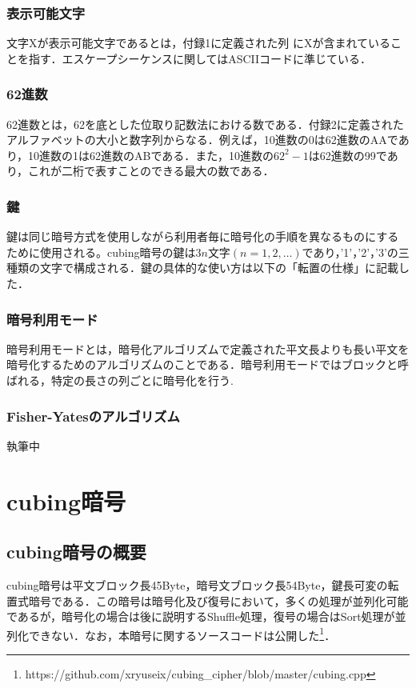 \documentclass[a4j,titlepage]{jsarticle}
\newcommand{\code}[1]{ \texttt{\detokenize{#1}} }
\begin{document}
\subsubsection{表示可能文字}
文字Xが表示可能文字であるとは，付録1に定義された列\code{printable_table}にXが含まれていることを指す．エスケープシーケンスに関してはASCIIコードに準じている．

\subsubsection{62進数}
62進数とは，62を底とした位取り記数法における数である．付録2に定義されたアルファベットの大小と数字列からなる．例えば，10進数の0は62進数のAAであり，10進数の1は62進数のABである．また，10進数の\(62^2-1\)は62進数の99であり，これが二桁で表すことのできる最大の数である．

\subsubsection{鍵}
鍵は同じ暗号方式を使用しながら利用者毎に暗号化の手順を異なるものにするために使用される。cubing暗号の鍵は\(3n\)文字\((n=1,2,\dots)\)であり，'1'，'2'，'3'の三種類の文字で構成される．鍵の具体的な使い方は以下の「転置の仕様」に記載した．

\subsubsection{暗号利用モード}
暗号利用モードとは，暗号化アルゴリズムで定義された平文長よりも長い平文を暗号化するためのアルゴリズムのことである．暗号利用モードではブロックと呼ばれる，特定の長さの列ごとに暗号化を行う.

\subsubsection{Fisher-Yatesのアルゴリズム}
執筆中

%
\section{cubing暗号}
\subsection{cubing暗号の概要}
cubing暗号は平文ブロック長45Byte，暗号文ブロック長54Byte，鍵長可変の転置式暗号である．この暗号は暗号化及び復号において，多くの処理が並列化可能であるが，暗号化の場合は後に説明するShuffle処理，復号の場合はSort処理が並列化できない．なお，本暗号に関するソースコードは公開した\footnote{https://github.com/xryuseix/cubing\_cipher/blob/master/cubing.cpp}．
\end{document}
